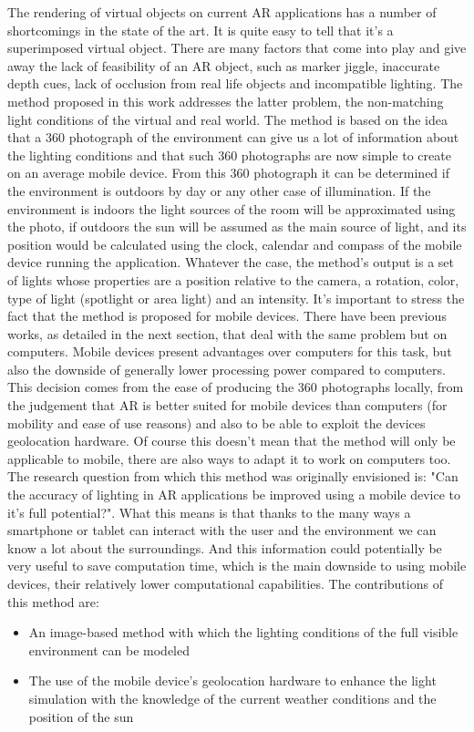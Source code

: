 
The rendering of virtual objects on current AR applications has a number of shortcomings in the state of the art. It is quite easy to tell that it’s a superimposed virtual object. There are many factors that come into play and give away the lack of feasibility of an AR object, such as marker jiggle, inaccurate depth cues, lack of occlusion from real life objects and incompatible lighting.
The method proposed in this work addresses the latter problem, the non-matching light conditions of the virtual and real world. The method is based on the idea that a 360 photograph of the environment can give us a lot of information about the lighting conditions and that such 360 photographs are now simple to create on an average mobile device. From this 360 photograph it can be determined if the environment is outdoors by day or any other case of illumination. If the environment is indoors the light sources of the room will be approximated using the photo, if outdoors the sun will be assumed as the main source of light, and its position would be calculated using the clock, calendar and compass of the mobile device running the application. \newline
Whatever the case, the method's output is a set of lights whose properties are a position relative to the camera, a rotation, color, type of light (spotlight or area light) and an intensity.
It's important to stress the fact that the method is proposed for mobile devices. There have been previous works, as detailed in the next section, that deal with the same problem but on computers. Mobile devices present advantages over computers for this task, but also the downside of generally lower processing power compared to computers. This decision comes from the ease of producing the 360 photographs locally, from the judgement that AR is better suited for mobile devices than computers (for mobility and ease of use reasons) and also to be able to exploit the devices geolocation hardware. Of course this doesn't mean that the method will only be applicable to mobile, there are also ways to adapt it to work on computers too.\newline
The research question from which this method was originally envisioned is: "Can the accuracy of lighting in AR applications be improved using a mobile device to it's full potential?". What this means is that thanks to the many ways a smartphone or tablet can interact with the user and the environment we can know a lot about the surroundings. And this information could potentially be very useful to save computation time, which is the main downside to using mobile devices, their relatively lower computational capabilities.\newline
The contributions of this method are:
\begin{itemize}
    \item An image-based method with which the lighting conditions of the full visible environment can be modeled
    \item The use of the mobile device's geolocation hardware to enhance the light simulation with the knowledge of the current weather conditions and the position of the sun
\end{itemize}